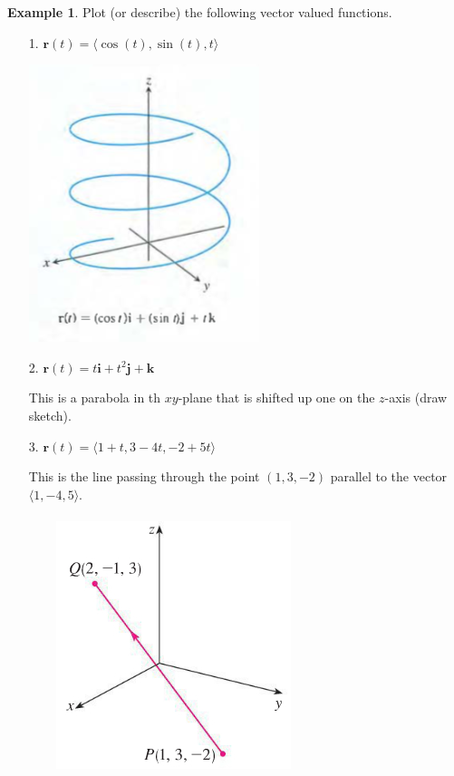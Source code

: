 \documentclass[12pt, letter]{article}
\theoremstyle{plain}
\numberwithin{theorem}{section}
\theoremstyle{definition}
\newtheorem{example}[theorem]{Example}
\begin{document}
\begin{example}
Plot (or describe) the following vector valued functions.\\
\begin{itemize}
\item[1.] $\bm{r}(t) = \langle \cos(t), \sin(t), t \rangle$

\bigskip

\begin{center}
\includegraphics[scale=0.7]{m1_f26}
\end{center}

\bigskip

\item[2.] $\bm{r}(t) = t\bm{i} + t^2\bm{j} + \bm{k}$

\bigskip

This is a parabola in th $xy$-plane that is shifted up one on the $z$-axis (draw sketch).

\bigskip

\item[3.] $\bm{r}(t) = \langle 1+t, 3-4t, -2+5t \rangle$

\bigskip

This is the line passing through the point $(1,3,-2)$ parallel to the vector $\langle 1, -4, 5 \rangle$.

\bigskip

\begin{center}
\includegraphics[scale=0.7]{m1_f27}
\end{center}

\bigskip

\end{itemize}
\end{example}
\end{document}
